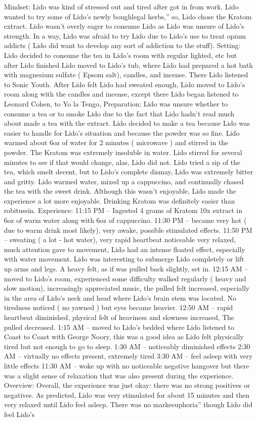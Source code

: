 \documentclass[12pt]{book}
\begin{document}
Mindset: Lido was kind of stressed out and tired after got in from work. Lido wanted to try some of Lido's newly boughlegal herbs,'' so, Lido chose the Kratom extract. Lido wasn't overly eager to consume Lido as Lido was unsure of Lido's strength. In a way, Lido was afraid to try Lido due to Lido's use to treat opium addicts ( Lido did want to develop any sort of addiction to the stuff). Setting: Lido decided to consume the tea in Lido's room with regular lighted, etc but after Lido finished Lido moved to Lido's tub, where Lido had prepared a hot bath with magnesium sulfate ( Epsom salt), candles, and incense. There Lido listened to Sonic Youth. After Lido felt Lido had sweated enough, Lido moved to Lido's room along with the candles and incense, except there Lido began listened to Leonard Cohen, to Yo la Tengo, Preparation: Lido was unsure whether to consume a tea or to smoke Lido due to the fact that Lido hadn't read much about made a tea with the extract. Lido decided to make a tea because Lido was easier to handle for Lido's situation and because the powder was so fine. Lido warmed about 6oz of water for 2 minutes ( microwave ) and stirred in the powder. The Kratom was extremely insoluble in water. Lido stirred for several minutes to see if that would change, alas, Lido did not. Lido tried a sip of the tea, which smelt decent, but to Lido's complete dismay, Lido was extremely bitter and gritty. Lido warmed water, mixed up a cappuccino, and continually chased the tea with the sweet drink. Although this wasn't enjoyable, Lido made the experience a lot more enjoyable. Drinking Kratom was definitely easier than robitussin. Experience: 11:15 PM -- Ingested 4 grams of Kratom 10x extract in 6oz of warm water along with 6oz of cappuccino. 11:30 PM -- became very hot ( due to warm drink most likely), very awake, possible stimulated effects. 11:50 PM -- sweating ( a lot - hot water), very rapid heartbeat noticeable very relaxed, much attention gave to movement, Lido had an intense floated effect, especially with water movement. Lido was interesting to submerge Lido completely or lift up arms and legs. A heavy felt, as if was pulled back slightly, set in. 12:15 AM -- moved to Lido's room, experienced some difficulty walked regularly ( heavy and slow motion), increasingly appreciated music, the pulled felt increased, especially in the area of Lido's neck and head where Lido's brain stem was located. No tiredness noticed ( no yawned ) but eyes became heavier. 12:50 AM -- rapid heartbeat diminished, physical felt of heaviness and slowness increased, The pulled decreased. 1:15 AM -- moved to Lido's bedded where Lido listened to Coast to Coast with George Noory, this was a good idea as Lido felt physically tired but not enough to go to sleep. 1:30 AM -- noticeably diminished effects 2:30 AM -- virtually no effects present, extremely tired 3:30 AM -- feel asleep with very little effects 11:30 AM -- woke up with no noticeable negative hangover but there was a slight sense of relaxation that was also present during the experience. Overview: Overall, the experience was just okay: there was no strong positives or negatives. As predicted, Lido was very stimulated for about 15 minutes and then very relaxed until Lido feel asleep. There was no markeeuphoria'' though Lido did feel Lido's 
\end{document}
